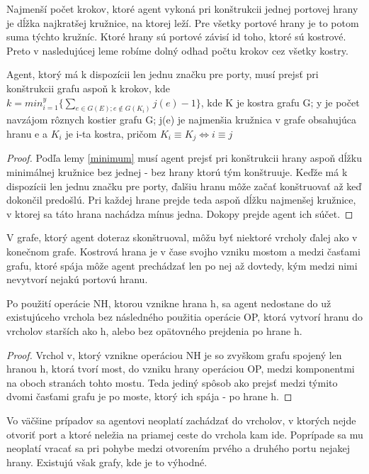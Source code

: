 Najmenší počet krokov, ktoré agent vykoná pri konštrukcii jednej
portovej hrany je dĺžka najkratšej kružnice, na ktorej leží. Pre všetky
portové hrany je to potom suma týchto kružníc. Ktoré hrany sú portové závisí
id toho, ktoré sú kostrové. Preto v nasledujúcej leme robíme dolný odhad
počtu krokov cez všetky kostry.

\begin{lem}
Agent, ktorý má k dispozícii len jednu značku pre porty, 
musí prejsť pri konštrukcii grafu aspoň k krokov, kde 
$k =min_{i=1}^{y}\{\sum_{e \in G(E); e \notin G(K_{i})} j(e)-1  \}$, 
kde K je kostra grafu G; y je počet navzájom rôznych kostier grafu G; j(e) je najmenšia kružnica v
grafe obsahujúca hranu e a $K_{i}$ je i-ta kostra, pričom $K_{i} \equiv K_{j}
\iff i \equiv j$
\end{lem}
\begin{proof}
Podľa lemy \ref{minimum} musí agent prejsť pri konštrukcii hrany aspoň dĺžku
minimálnej kružnice bez jednej - bez hrany ktorú tým konštruuje. Keďže má k
dispozícii len jednu značku pre porty, ďalšiu hranu môže začať konštruovať
až keď dokončil predošlú. Pri každej hrane prejde teda aspoň dĺžku
najmenšej kružnice, v ktorej sa táto hrana nachádza mínus jedna. Dokopy
prejde agent ich súčet.
\end{proof}

V grafe, ktorý agent doteraz skonštruoval, môžu byť niektoré vrcholy ďalej
ako v konečnom grafe. Kostrová hrana je v čase svojho vzniku mostom a medzi
časťami grafu, ktoré spája môže agent prechádzať len po nej až dovtedy, kým
medzi nimi nevytvorí nejakú portovú hranu.

\begin{lem}
Po použití operácie NH, ktorou vznikne hrana h, sa agent nedostane do
už existujúceho vrchola bez následného použitia
operácie OP, ktorá vytvorí hranu do vrcholov starších ako h,
alebo bez opätovného prejdenia po hrane h.
\end{lem}
\begin{proof}
Vrchol v, ktorý vznikne operáciou NH je so zvyškom grafu spojený len hranou
h, ktorá tvorí most, do vzniku hrany operáciou OP, medzi komponentmi na oboch
stranách tohto mostu. Teda jediný spôsob ako prejsť medzi týmito dvomi
časťami grafu je po moste, ktorý ich spája - po hrane h.
\end{proof}

Vo väčšine prípadov sa agentovi neoplatí zachádzať do vrcholov, v ktorých
nejde otvoriť port a ktoré neležia na priamej ceste do vrchola kam ide.
Poprípade sa mu neoplatí vracať sa pri pohybe medzi otvorením prvého a
druhého portu nejakej hrany. Existujú však grafy, kde je to výhodné.

